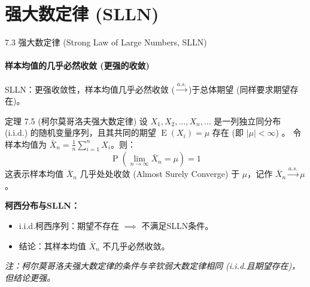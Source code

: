 \documentclass[UTF8]{beamer}
\DeclareMathOperator{\E}{\operatorname{E}}
\DeclareMathOperator{\Prob}{\operatorname{P}}
\begin{document}
\section{强大数定律 (SLLN)}
\begin{frame}[shrink=10]{7.3 强大数定律 (Strong Law of Large Numbers, SLLN)}
    \framesubtitle{样本均值的几乎必然收敛 (更强的收敛)}
    SLLN：更强收敛性，样本均值\alert{几乎必然收敛} ($\xrightarrow{a.s.}$)于总体期望 (同样要求期望存在)。
    \vspace{0.3cm}

    \begin{block}{定理 7.5 (柯尔莫哥洛夫强大数定律)} %
        设 $X_1, X_2, \dots, X_n, \dots$ 是一列\alert{独立同分布 (i.i.d.)} 的随机变量序列，且其共同的期望 $\E(X_i) = \mu$ \alert{存在} (即 $|\mu| < \infty$) 。
        令样本均值为 $\bar{X}_n = \frac{1}{n} \sum_{i=1}^{n} X_i$。则：
        \[ \Prob\left( \lim_{n \to \infty} \bar{X}_n = \mu \right) = 1 \]
        这表示样本均值 $\bar{X}_n$ \alert{几乎处处收敛} (Almost Surely Converge) 于 $\mu$，记作 $\bar{X}_n \xrightarrow{a.s.} \mu$。
    \end{block}
    \vspace{0.3cm}
    \textbf{柯西分布与SLLN：}
    \begin{itemize}
        \item i.i.d.柯西序列：期望\alert{不存在} $\implies$ \alert{不满足}SLLN条件。
        \item 结论：其样本均值 $\bar{X}_n$ \alert{不}几乎必然收敛。
    \end{itemize}
    \footnotesize
    \textit{注：柯尔莫哥洛夫强大数定律的条件与辛钦弱大数定律相同 (i.i.d.且期望存在)，但结论更强。}
\end{frame}
\end{document}
